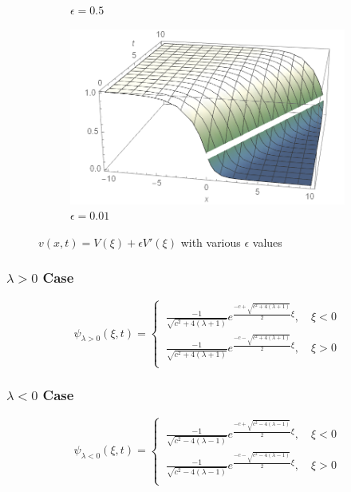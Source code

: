 \documentclass[12pt]{article}
\begin{document}
\begin{figure}[H]
\begin{subfigure}[h]{0.4\textwidth}
        \caption{$\epsilon=0.5$}
        \label{fig:t10}
    \end{subfigure}
    \begin{subfigure}[h]{0.4\textwidth}
        \includegraphics[width=\textwidth]{Part2Plots/e0}
        \caption{$\epsilon=0.01$}
        \label{fig:t100}
    \end{subfigure}
    \caption{$v(x,t) = V(\xi) + \epsilon V'(\xi)$ with various $\epsilon$ values}\label{fig:timeplots}
\end{figure}

\subsubsection{$\lambda > 0$ Case}
\begin{equation}\label{solnlambda+}
\psi_{\lambda >0}(\xi,t)=
\begin{cases}
\ \frac{-1}{\sqrt{c^2+4(\lambda+1)}}e^{\frac{-c+\sqrt{c^2+4(\lambda+1)}}{2}\xi},\quad \xi < 0 \\
\ \frac{-1}{\sqrt{c^2+4(\lambda+1)}}e^{\frac{-c-\sqrt{c^2+4(\lambda+1)}}{2}\xi},\quad \xi > 0\\
\end{cases}
\end{equation}

\subsubsection{$\lambda < 0$ Case}
\begin{equation}\label{solnlambda-}
\psi_{\lambda <0}(\xi,t)=
\begin{cases}
\ \frac{-1}{\sqrt{c^2-4(\lambda-1)}}e^{\frac{-c+\sqrt{c^2-4(\lambda-1)}}{2}\xi},\quad \xi < 0 \\
\ \frac{-1}{\sqrt{c^2-4(\lambda-1)}}e^{\frac{-c-\sqrt{c^2-4(\lambda-1)}}{2}\xi},\quad \xi > 0\\
\end{cases}
\end{equation}
\end{document}
